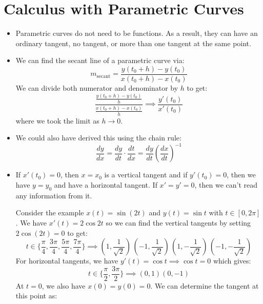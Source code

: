 \section{Calculus with Parametric Curves}
\begin{itemize}
    \item Parametric curves do not need to be functions. As a result, they can have an ordinary tangent, no tangent, or more than one tangent at the same point.
    \item We can find the secant line of a parametric curve via:
    \begin{equation}
        m_\text{secant} = \frac{y(t_0+h)-y(t_0)}{x(t_0+h)-x(t_0)}
    \end{equation}
    We can divide both numerator and denominator by $h$ to get:
    \begin{equation}
        \frac{\frac{y(t_0+h)-y(t_0)}{h}}{\frac{x(t_0+h)-x(t_0)}{h}} \implies \frac{y'(t_0)}{x'(t_0)}
    \end{equation}
    where we took the limit as $h\to 0$.
    \item We could also have derived this using the chain rule:
    \begin{equation}
        \frac{dy}{dx} = \frac{dy}{dt}\cdot \frac{dt}{dx} = \frac{dy}{dt}\left(\frac{dx}{dt}\right)^{-1}
    \end{equation}
    \item If $x'(t_0)=0$, then $x=x_0$ is a vertical tangent and if $y'(t_0)=0$, then we have $y=y_0$ and have a horizontal tangent. If $x'=y'=0$, then we can't read any information from it.
    \begin{example}
        Consider the example $x(t) = \sin(2t)$ and $y(t)=\sin t$ with $t\in [0,2\pi]$. We have $x'(t) = 2\cos 2t$ so we can find the vertical tangents by setting $2\cos(2t) = 0$ to get:
        \begin{equation}
            t \in \{\frac{\pi}{4}, \frac{3\pi}{4}, \frac{5\pi}{4}, \frac{7\pi}{4}\} \implies \left(1,\frac{1}{\sqrt{2}}\right)\,\left(-1,\frac{1}{\sqrt{2}}\right)\,\left(1,-\frac{1}{\sqrt{2}}\right)\,\left(-1,-\frac{1}{\sqrt{2}}\right)
        \end{equation}
        For horizontal tangents, we have $y'(t) = \cos t \implies \cos t = 0$ which gives:
        \begin{equation}
            t \in \{\frac{\pi}{2}, \frac{3\pi}{2}\} \implies (0,1) (0,-1)
        \end{equation}
        At $t=0$, we also have $x(0)=y(0)=0$. We can determine the tangent at this point as:

\end{example}
\end{itemize}
